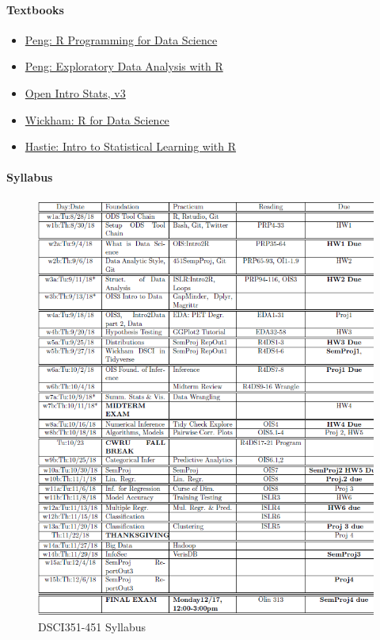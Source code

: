 \documentclass[]{article}
\providecommand{\tightlist}{%
  \setlength{\itemsep}{0pt}\setlength{\parskip}{0pt}}
\let\oldparagraph\paragraph
\renewcommand{\paragraph}[1]{\oldparagraph{#1}\mbox{}}
\begin{document}
\paragraph{Textbooks}\label{textbooks}

\begin{itemize}
\tightlist
\item
  \href{https://play.google.com/books/reader?printsec=frontcover\&output=reader\&id=F1mVHgAAAEAJ\&pg=GBS.PA1}{Peng:
  R Programming for Data Science}
\item
  \href{https://play.google.com/books/reader?printsec=frontcover\&output=reader\&id=R-09BgAAAEAJ\&pg=GBS.PA1}{Peng:
  Exploratory Data Analysis with R}
\item
  \href{https://play.google.com/books/reader?printsec=frontcover\&output=reader\&id=G2EOBwAAAEAJ\&pg=GBS.PA0}{Open
  Intro Stats, v3}
\item
  \href{https://play.google.com/books/reader?printsec=frontcover\&output=reader\&id=I6y3DQAAQBAJ\&pg=GBS.PA1}{Wickham:
  R for Data Science}
\item
  \href{https://play.google.com/books/reader?printsec=frontcover\&output=reader\&id=KtuPCwAAAEAJ\&pg=GBS.PA0}{Hastie:
  Intro to Statistical Learning with R}
\end{itemize}

\paragraph{Syllabus}\label{syllabus}

\begin{figure}
\centering
\includegraphics{./figs/syllabus.png}
\caption{DSCI351-451 Syllabus}
\end{figure}
\end{document}
